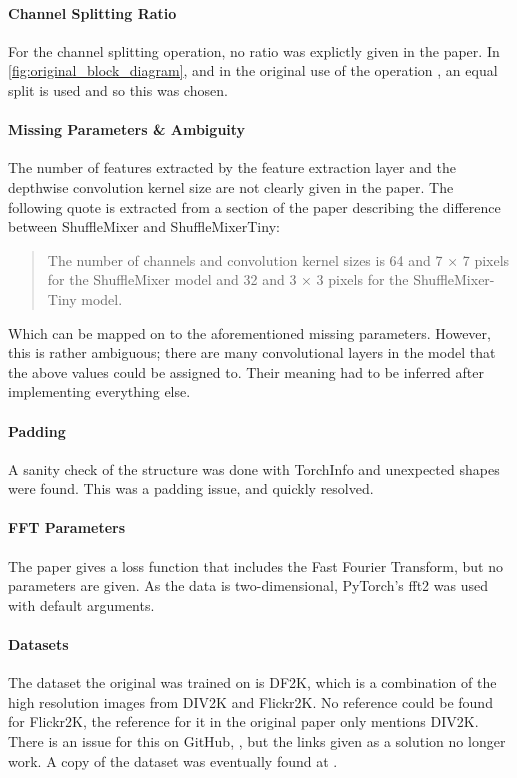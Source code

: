 \documentclass{article}
\begin{document}
    \paragraph{Channel Splitting Ratio} For the channel splitting operation, no ratio was explictly given in the paper. In \cref{fig:original_block_diagram}, and in the original use of the operation \citep{ma2018shufflenet}, an equal split is used and so this was chosen.

    \paragraph{Missing Parameters \& Ambiguity} The number of features extracted by the feature extraction layer and the depthwise convolution kernel size are not clearly given in the paper. The following quote is extracted from a section of the paper describing the difference between ShuffleMixer and ShuffleMixerTiny:

    \begin{quotation}
    The number of channels and convolution kernel sizes is 64 and
    7 × 7 pixels for the ShuffleMixer model and 32 and 3 × 3 pixels for the ShuffleMixer-Tiny model.
    \end{quotation}

    Which can be mapped on to the aforementioned missing parameters. However, this is rather ambiguous; there are many convolutional layers in the model that the above values could be assigned to. Their meaning had to be inferred after implementing everything else.

    \paragraph{Padding} A sanity check of the structure was done with TorchInfo and unexpected shapes were found. This was a padding issue, and quickly resolved.

    \paragraph{FFT Parameters} The paper gives a loss function that includes the Fast Fourier Transform, but no parameters are given. As the data is two-dimensional, PyTorch's fft2 was used with default arguments.

    \paragraph{Datasets} The dataset the original was trained on is DF2K, which is a combination of the high resolution images from DIV2K \citep{Agustsson_2017_CVPR_Workshops} and Flickr2K. No reference could be found for Flickr2K, the reference for it in the original paper \citep{DBLP:journals/corr/LimSKNL17} only mentions DIV2K. There is an issue for this on GitHub, \citet{LimbeeGithub}, but the links given as a solution no longer work. A copy of the dataset was eventually found at \citet{Ddlee_2019Dataset}.
\end{document}
